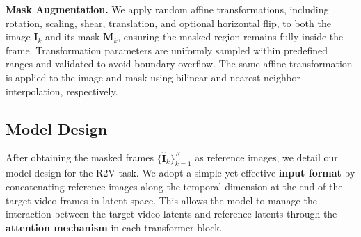\noindent \textbf{Mask Augmentation.}
We apply random affine transformations, including rotation, scaling, shear, translation, and optional horizontal flip, to both the image $\mathbf{I}_{k}$ and its mask $\mathbf{M}_{k}$, ensuring the masked region remains fully inside the frame.
Transformation parameters are uniformly sampled within predefined ranges and validated to avoid boundary overflow.
The same affine transformation is applied to the image and mask using bilinear and nearest-neighbor interpolation, respectively.


\subsection{Model Design}
\label{saber:sec:model_design}

After obtaining the masked frames $\{ \hat{\mathbf{I}}_{k} \}_{k=1}^{K}$ as reference images, we detail our model design for the R2V task.
We adopt a simple yet effective \textbf{input format} by concatenating reference images along the temporal dimension at the end of the target video frames in latent space.
This allows the model to manage the interaction between the target video latents and reference latents through the \textbf{attention mechanism} in each transformer block.

